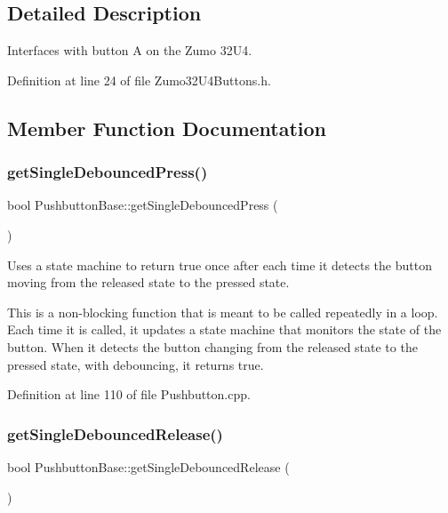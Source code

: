 \subsection{Detailed Description}
Interfaces with button A on the Zumo 32\+U4. 

Definition at line 24 of file Zumo32\+U4\+Buttons.\+h.



\subsection{Member Function Documentation}
\mbox{\label{class_pushbutton_base_a93953875c8b1c5f69dec3984774de296}} 
\subsubsection{\texorpdfstring{get\+Single\+Debounced\+Press()}{getSingleDebouncedPress()}}
{\footnotesize\ttfamily bool Pushbutton\+Base\+::get\+Single\+Debounced\+Press (\begin{DoxyParamCaption}{ }\end{DoxyParamCaption})\hspace{0.3cm}{\ttfamily [inherited]}}



Uses a state machine to return true once after each time it detects the button moving from the released state to the pressed state. 

This is a non-\/blocking function that is meant to be called repeatedly in a loop. Each time it is called, it updates a state machine that monitors the state of the button. When it detects the button changing from the released state to the pressed state, with debouncing, it returns true. 

Definition at line 110 of file Pushbutton.\+cpp.

\mbox{\label{class_pushbutton_base_ae568f5db0e8804247e0dcab72a311d42}} 
\subsubsection{\texorpdfstring{get\+Single\+Debounced\+Release()}{getSingleDebouncedRelease()}}
{\footnotesize\ttfamily bool Pushbutton\+Base\+::get\+Single\+Debounced\+Release (\begin{DoxyParamCaption}{ }\end{DoxyParamCaption})\hspace{0.3cm}{\ttfamily [inherited]}}



